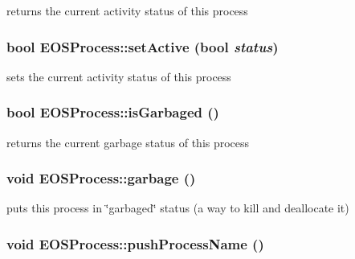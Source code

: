 returns the current activity status of this process 

\hypertarget{classEOSProcess_b5760c226c46227d395ec2e8fef7d340}{
\subsubsection[{setActive}]{\setlength{\rightskip}{0pt plus 5cm}bool EOSProcess::setActive (bool {\em status})}}
\label{classEOSProcess_b5760c226c46227d395ec2e8fef7d340}


sets the current activity status of this process 

\hypertarget{classEOSProcess_d5f8f932b1194afba3e3e4f37883e29a}{
\subsubsection[{isGarbaged}]{\setlength{\rightskip}{0pt plus 5cm}bool EOSProcess::isGarbaged ()}}
\label{classEOSProcess_d5f8f932b1194afba3e3e4f37883e29a}


returns the current garbage status of this process 

\hypertarget{classEOSProcess_bec41530a483ecc6b9b35b34388515ec}{
\subsubsection[{garbage}]{\setlength{\rightskip}{0pt plus 5cm}void EOSProcess::garbage ()}}
\label{classEOSProcess_bec41530a483ecc6b9b35b34388515ec}


puts this process in \char`\"{}garbaged\char`\"{} status (a way to kill and deallocate it) 

\hypertarget{classEOSProcess_f05d10a4411470314d51dea89c980967}{
\subsubsection[{pushProcessName}]{\setlength{\rightskip}{0pt plus 5cm}void EOSProcess::pushProcessName ()}}
\label{classEOSProcess_f05d10a4411470314d51dea89c980967}


